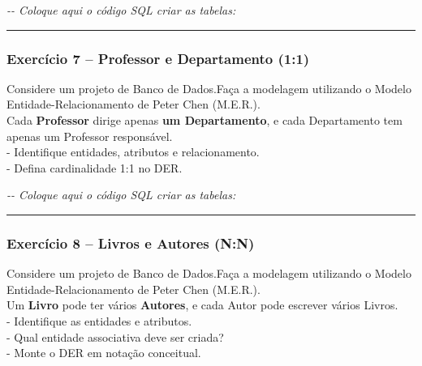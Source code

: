 \documentclass[
]{book}
\newenvironment{Shaded}{\begin{snugshade}}{\end{snugshade}}
\newcommand{\CommentTok}[1]{\textcolor[rgb]{0.56,0.35,0.01}{\textit{#1}}}
\begin{document}
\begin{Shaded}
\begin{Highlighting}[]
\CommentTok{{-}{-} Coloque aqui o código SQL criar as tabelas:}


\end{Highlighting}
\end{Shaded}

\begin{center}\rule{0.5\linewidth}{0.5pt}\end{center}

\subsubsection{Exercício 7 -- Professor e Departamento (1:1)}\label{exercuxedcio-7-professor-e-departamento-11}

Considere um projeto de Banco de Dados.Faça a modelagem utilizando o Modelo Entidade-Relacionamento de Peter Chen (M.E.R.).\\
Cada \textbf{Professor} dirige apenas \textbf{um Departamento}, e cada Departamento tem apenas um Professor responsável.\\
- Identifique entidades, atributos e relacionamento.\\
- Defina cardinalidade 1:1 no DER.



\begin{Shaded}
\begin{Highlighting}[]
\CommentTok{{-}{-} Coloque aqui o código SQL criar as tabelas:}


\end{Highlighting}
\end{Shaded}

\begin{center}\rule{0.5\linewidth}{0.5pt}\end{center}

\subsubsection{Exercício 8 -- Livros e Autores (N:N)}\label{exercuxedcio-8-livros-e-autores-nn}

Considere um projeto de Banco de Dados.Faça a modelagem utilizando o Modelo Entidade-Relacionamento de Peter Chen (M.E.R.).\\
Um \textbf{Livro} pode ter vários \textbf{Autores}, e cada Autor pode escrever vários Livros.\\
- Identifique as entidades e atributos.\\
- Qual entidade associativa deve ser criada?\\
- Monte o DER em notação conceitual.
\end{document}
